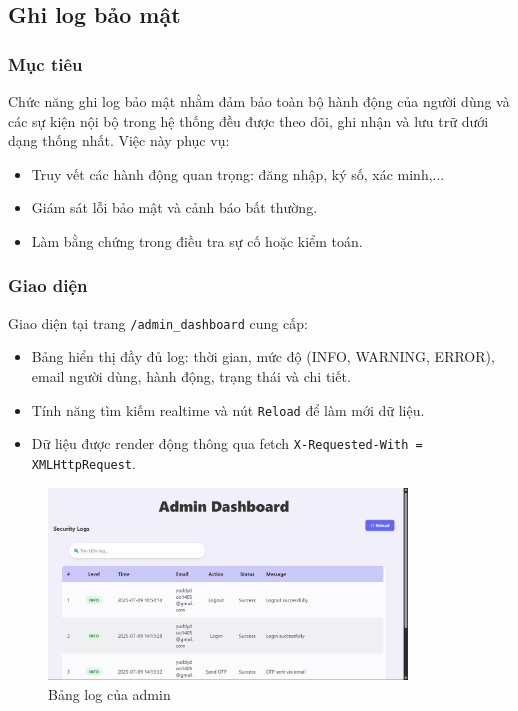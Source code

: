 \newpage
\subsection{Ghi log bảo mật}

\subsubsection*{Mục tiêu}
Chức năng ghi log bảo mật nhằm đảm bảo toàn bộ hành động của người dùng và các sự kiện nội bộ trong hệ thống đều được theo dõi, ghi nhận và lưu trữ dưới dạng thống nhất. Việc này phục vụ:
\begin{itemize}
    \item Truy vết các hành động quan trọng: đăng nhập, ký số, xác minh,...
    \item Giám sát lỗi bảo mật và cảnh báo bất thường.
    \item Làm bằng chứng trong điều tra sự cố hoặc kiểm toán.
\end{itemize}

\subsubsection*{Giao diện}
Giao diện tại trang \texttt{/admin\_dashboard} cung cấp:
\begin{itemize}
    \item Bảng hiển thị đầy đủ log: thời gian, mức độ (INFO, WARNING, ERROR), email người dùng, hành động, trạng thái và chi tiết.
    \item Tính năng tìm kiếm realtime và nút \texttt{Reload} để làm mới dữ liệu.
    \item Dữ liệu được render động thông qua fetch \texttt{X-Requested-With = XMLHttpRequest}.
\end{itemize}

\begin{figure}[H]
    \centering
    \includegraphics[width=0.85\textwidth]{img/11_logger/11_logger_table.png}
    \caption{Bảng log của admin}
\end{figure}

